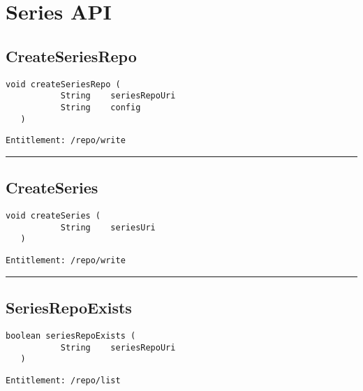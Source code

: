 \chapter{Series API}

\section{CreateSeriesRepo}
\label{Api:CreateSeriesRepo}
\begin{lstlisting}[style=nonumbers]
   void createSeriesRepo (
           String    seriesRepoUri
           String    config
   )
\end{lstlisting}
\begin{Verbatim}[formatcom=\color{Maroon}]
  Entitlement: /repo/write
\end{Verbatim}



\rule{12cm}{2pt}
\section{CreateSeries}
\label{Api:CreateSeries}
\begin{lstlisting}[style=nonumbers]
   void createSeries (
           String    seriesUri
   )
\end{lstlisting}
\begin{Verbatim}[formatcom=\color{Maroon}]
  Entitlement: /repo/write
\end{Verbatim}



\rule{12cm}{2pt}
\section{SeriesRepoExists}
\label{Api:SeriesRepoExists}
\begin{lstlisting}[style=nonumbers]
   boolean seriesRepoExists (
           String    seriesRepoUri
   )
\end{lstlisting}
\begin{Verbatim}[formatcom=\color{Maroon}]
  Entitlement: /repo/list
\end{Verbatim}




